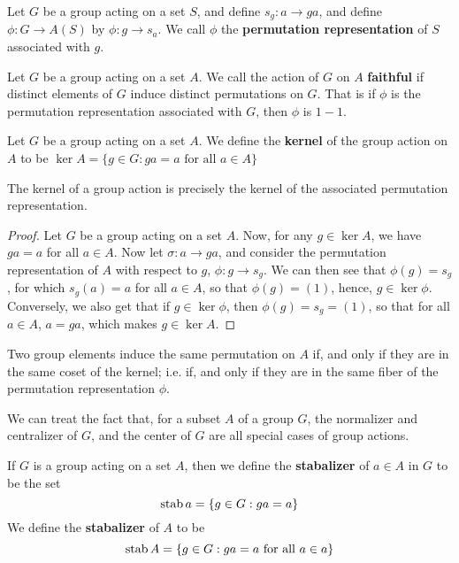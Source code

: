 \begin{definition}
  Let $G$ be a group acting on a set  $S$, and define $s_g:a \rightarrow
  ga$, and define $\phi:G \rightarrow A(S)$ by $\phi:g \rightarrow s_a$.
  We call $\phi$ the  \textbf{permutation representation} of $S$ associated
  with  $g$.
\end{definition}

\begin{definition}
  Let $G$ be a group acting on a set $A$. We call the action of $G$ on  $A$
  \textbf{faithful} if distinct elements of $G$ induce distinct permutations
  on  $G$. That is if $\phi$ is the permutation representation associated
  with  $G$, then  $\phi$ is  $1-1$.
\end{definition}

\begin{definition}
  Let $G$ be a group acting on a set $A$. We define the \textbf{kernel} of the
  group action on $A$ to be  $\ker{A}=\{g \in G : ga=a \text{ for all } a \in
  A\}$
\end{definition}

\begin{lemma}\label{lemma_4.1.2}
  The kernel of a group action is precisely the kernel of the associated
  permutation representation.
\end{lemma}
\begin{proof}
  Let $G$ be a group acting on a set  $A$. Now, for any  $g \in \ker{A}$, we
  have $ga=a$ for all  $a \in A$. Now let $\sigma:a \rightarrow ga$, and
  consider the permutation representation of $A$ with respect to  $g$,
  $\phi:g \rightarrow s_g$. We can then see that $\phi(g)=s_g$,
  for which $s_g(a)=a$ for all $a \in A$, so that  $\phi(g)=(1)$, hence,
  $g \in \ker{\phi}$. Conversely, we also get that if $g \in \ker{\phi}$, then
  $\phi(g)=s_g=(1)$, so that for all $a \in A$, $a=ga$, which makes  $g
  \in \ker{A}$.
\end{proof}
\begin{corollary}
  Two group elements induce the same permutation on $A$ if, and only if they
  are in the same coset of the kernel; i.e. if, and only if they are in the
  same fiber of the permutation representation $\phi$.
\end{corollary}


We can treat the fact that, for a subset $A$ of a group  $G$, the normalizer and
centralizer of  $G$, and the center of  $G$ are all special cases of group
actions.

\begin{definition}
  If $G$ is a group acting on a set  $A$, then we define the
  \textbf{stabalizer} of $a \in A$ in $G$ to be the set
  \begin{equation*}
    \operatorname{stab}{a}=\{g \in G : ga=a\}
  \end{equation*}
  We define the \textbf{stabalizer} of $A$ to be
  \begin{equation*}
    \operatorname{stab}{A}=\{g \in G : ga=a \text{ for all } a \in a\}
  \end{equation*}
\end{definition}

